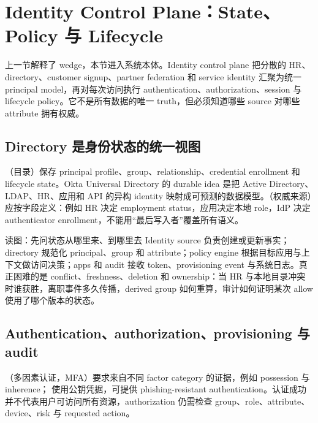 \section{Identity Control Plane：State、Policy 与 Lifecycle}

上一节解释了 wedge，本节进入系统本体。Identity control plane 把分散的 HR、directory、customer signup、partner federation 和 service identity 汇聚为统一 principal model，再对每次访问执行 authentication、authorization、session 与 lifecycle policy。它不是所有数据的唯一 truth，但必须知道哪些 source 对哪些 attribute 拥有权威。

\subsection{Directory 是身份状态的统一视图}

（目录）保存 principal profile、group、relationship、credential enrollment 和 lifecycle state。Okta Universal Directory 的 durable idea 是把 Active Directory、LDAP、HR、应用和 API 的异构 identity 映射成可预测的数据模型。（权威来源）应按字段定义：例如 HR 决定 employment status，应用决定本地 role，IdP 决定 authenticator enrollment，不能用“最后写入者”覆盖所有语义。


\begin{knowledgebox}{读图：先问状态从哪里来、到哪里去}
Identity source 负责创建或更新事实；directory 规范化 principal、group 和 attribute；policy engine 根据目标应用与上下文做访问决策；apps 和 audit 接收 token、provisioning event 与系统日志。真正困难的是 conflict、freshness、deletion 和 ownership：当 HR 与本地目录冲突时谁获胜，离职事件多久传播，derived group 如何重算，审计如何证明某次 allow 使用了哪个版本的状态。
\end{knowledgebox}

\subsection{Authentication、authorization、provisioning 与 audit}

（多因素认证，MFA）要求来自不同 factor category 的证据，例如 possession 与 inherence； 使用公钥凭据，可提供 phishing-resistant authentication。认证成功并不代表用户可访问所有资源，authorization 仍需检查 group、role、attribute、device、risk 与 requested action。

